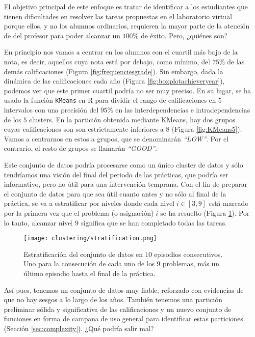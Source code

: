 El objetivo principal de este enfoque es tratar de identificar a los estudiantes que tienen dificultades en resolver las tareas propuestas en el laboratorio virtual porque ellos, y no los alumnos ordinarios, requieren la mayor parte de la atención de del profesor para poder alcanzar un $100\%$ de éxito. Pero, ¿quiénes son?

En principio nos vamos a centrar en los alumnos con el cuartil más bajo de la nota, es decir, aquellos cuya nota está por debajo, como mínimo, del $75\%$ de las demás calificaciones (Figura \ref{fig:frequenciesgrade}). Sin embargo, dada la dinámica de las calificaciones cada año (Figura \ref{fig:boxplotachieveryear}), podemos ver que este primer cuartil podría no ser muy preciso. En su lugar, se ha usado la función \texttt{KMeans} en R para dividir el rango de calificaciones en $5$ intervalos con una precisión del $95\%$ en las interdependencias e intradependencias de los $5$ clusters. En la partición obtenida mediante KMeans, hay dos grupos cuyas calificaciones son son estrictamente inferiores a $8$ (Figura \ref{fig:KMeans5}). Vamos a centrarnos en estos a grupos, que se denominarán \emph{``LOW''}. Por el contrario, el resto de grupos se llamarán \emph{``GOOD''}.

Este conjunto de datos podría procesarse como un único cluster de datos y sólo tendríamos una visión del final del periodo de las prácticas, que podría ser informativo, pero no útil para una intervención temprana. Con el fin de preparar el conjunto de datos para que sea útil cuanto antes y no sólo al final de la práctica, se va a estratificar por niveles donde cada nivel $i \in [3,9]$ está marcado por la primera vez que el problema (o asignación) $i$ se ha resuelto (Figura \ref{fig:stratification}). Por lo tanto, alcanzar nivel $9$ significa que se han completado todas las tareas.

\begin{figure}[H]
    \centering
    \texttt{[image: clustering/stratification.png]}
    \caption{Estratificación del conjunto de datos en $10$ episodios consecutivos. Uno para la consecución de cada uno de los $9$ problemas, más un último episodio hasta el final de la práctica.}
    \label{fig:stratification}
\end{figure}

Así pues, tenemos un conjunto de datos muy fiable, reforzado con evidencias de que no hay sesgos a lo largo de los años. También tenemos una partición preliminar sólida y significativa de las calificaciones y un nuevo conjunto de funciones en forma de campana de uso general para identificar estas particiones (Sección \ref{sec:complexity}). ¿Qué podría salir mal?